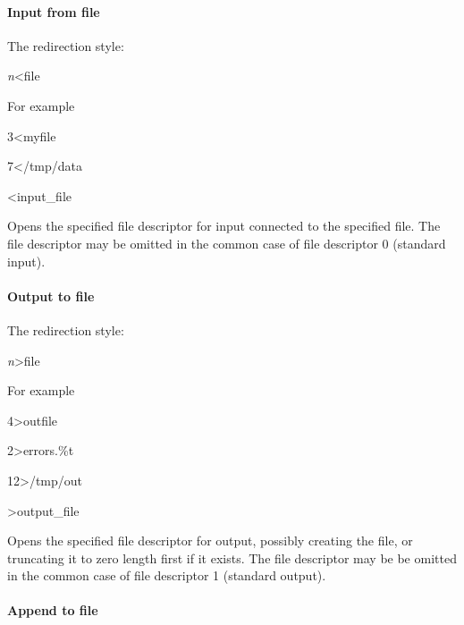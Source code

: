 \paragraph{Input from file}

The redirection style:

\begin{expara}

\textit{n}{\textless}file

\end{expara}

For example

\begin{expara}

3{\textless}myfile

7{\textless}/tmp/data

{\textless}input\_file

\end{expara}

Opens the specified file descriptor for input connected to the specified file. The file descriptor may be omitted in the common case
of file descriptor 0 (standard input).

\paragraph{Output to file}

The redirection style:

\begin{expara}

\textit{n}{\textgreater}file

\end{expara}

For example

\begin{expara}

4{\textgreater}outfile

2{\textgreater}errors.\%t

12{\textgreater}/tmp/out

{\textgreater}output\_file

\end{expara}

Opens the specified file descriptor for output, possibly creating the file, or truncating it to zero length first if it exists.
The file descriptor may be be omitted in the common case of file descriptor 1 (standard output).

\paragraph{Append to file}

